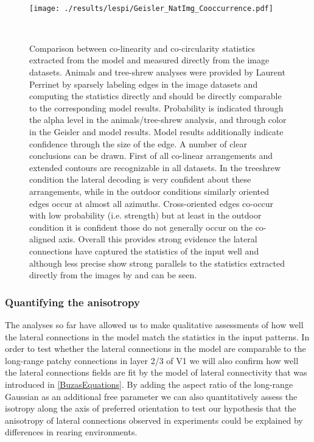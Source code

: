 \begin{figure}
  \begin{minipage}[t]{0.6\textwidth}
    \mbox{}\\[-\baselineskip]    \texttt{[image: ./results/lespi/Geisler\_NatImg\_Cooccurrence.pdf]}
  \end{minipage}\hfill
  \begin{minipage}[t]{0.35\textwidth}
    \mbox{}\\[-\baselineskip]
	\caption{Comparison between co-linearity and co-circularity
      statistics extracted from the model and measured directly from
      the image datasets. Animals and tree-shrew analyses were
      provided by Laurent Perrinet by sparsely labeling edges in the
      image datasets and computing the statistics directly and should
      be directly comparable to the corresponding model
      results. Probability is indicated through the alpha level in the
      animals/tree-shrew analysis, and through color in the Geisler
      and model results. Model results additionally indicate
      confidence through the size of the edge. A number of clear
      conclusions can be drawn. First of all co-linear arrangements
      and extended contours are recognizable in all datasets. In the
      treeshrew condition the lateral decoding is very confident about
      these arrangements, while in the outdoor conditions similarly
      oriented edges occur at almost all azimuths. Cross-oriented
      edges co-occur with low probability (i.e. strength) but at least
      in the outdoor condition it is confident those do not generally
      occur on the co-aligned axis. Overall this provides strong
      evidence the lateral connections have captured the statistics of
      the input well and although less precise show strong parallels
      to the statistics extracted directly from the images by
      \cite{Geisler2001} and \cite{Perrinet2015} can be seen.}
	\label{NatImgGeisler}
    \end{minipage}
\end{figure}

\subsubsection*{Quantifying the anisotropy}

The analyses so far have allowed us to make qualitative assessments of
how well the lateral connections in the model match the statistics in
the input patterns. In order to test whether the lateral connections
in the model are comparable to the long-range patchy connections in
layer 2/3 of V1 we will also confirm how well the lateral connections
fields are fit by the \cite{Buzas2006} model of lateral connectivity
that was introduced in \ref{BuzasEquations}. By adding the aspect
ratio of the long-range Gaussian as an additional free parameter we
can also quantitatively assess the isotropy along the axis of
preferred orientation to test our hypothesis that the anisotropy of
lateral connections observed in experiments \citep{Bosking1997} could
be explained by differences in rearing environments.

